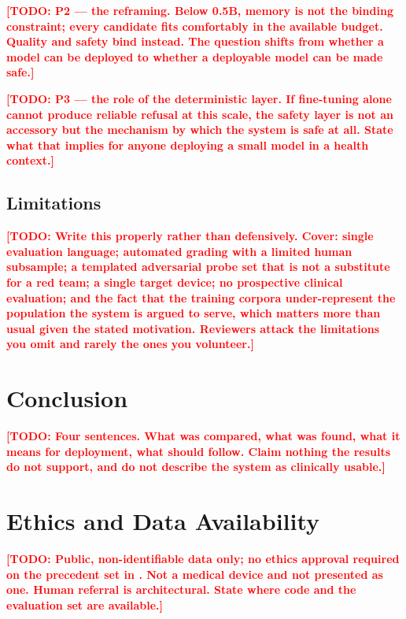 \documentclass[10pt,twocolumn]{article}
\newcommand{\TODO}[1]{\textcolor{red}{\textbf{[TODO: #1]}}}
\begin{document}
\TODO{P2 --- the reframing. Below 0.5B, memory is not the binding constraint;
every candidate fits comfortably in the available budget. Quality and safety
bind instead. The question shifts from whether a model can be deployed to
whether a deployable model can be made safe.}

\TODO{P3 --- the role of the deterministic layer. If fine-tuning alone cannot
produce reliable refusal at this scale, the safety layer is not an accessory
but the mechanism by which the system is safe at all. State what that implies
for anyone deploying a small model in a health context.}

\subsection{Limitations}
\TODO{Write this properly rather than defensively. Cover: single evaluation
language; automated grading with a limited human subsample; a templated
adversarial probe set that is not a substitute for a red team; a single target
device; no prospective clinical evaluation; and the fact that the training
corpora under-represent the population the system is argued to serve, which
matters more than usual given the stated motivation. Reviewers attack the
limitations you omit and rarely the ones you volunteer.}

\section{Conclusion}
\TODO{Four sentences. What was compared, what was found, what it means for
deployment, what should follow. Claim nothing the results do not support, and
do not describe the system as clinically usable.}

\section*{Ethics and Data Availability}
\TODO{Public, non-identifiable data only; no ethics approval required on the
precedent set in \citet{elangovan2025medpal}. Not a medical device and not
presented as one. Human referral is architectural. State where code and the
evaluation set are available.}

\balance


\end{document}
